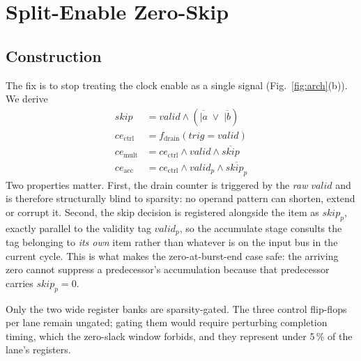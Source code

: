 \documentclass[journal,twocolumn]{IEEEtran}
\begin{document}
\section{Split-Enable Zero-Skip}
\label{sec:fix}

\subsection{Construction}
The fix is to stop treating the clock enable as a single signal
(Fig.~\ref{fig:arch}(b)). We derive
\begin{align}
\mathit{skip} &= \mathit{valid}\wedge\left(\overline{|a}\;\vee\;\overline{|b}\right)\\
\mathit{ce}_{\mathrm{ctrl}} &= f_{\mathrm{drain}}(\mathit{trig}=\mathit{valid})\\
\mathit{ce}_{\mathrm{mult}} &= \mathit{ce}_{\mathrm{ctrl}}\wedge \mathit{valid}\wedge\overline{\mathit{skip}}\\
\mathit{ce}_{\mathrm{acc}}  &= \mathit{ce}_{\mathrm{ctrl}}\wedge \mathit{valid}_{p}\wedge\overline{\mathit{skip}_{p}}
\end{align}
Two properties matter. First, the drain counter is triggered by the
\emph{raw} $\mathit{valid}$ and is therefore structurally blind to sparsity:
no operand pattern can shorten, extend or corrupt it. Second, the skip
decision is registered alongside the item as $\mathit{skip}_p$, exactly
parallel to the validity tag $\mathit{valid}_p$, so the accumulate stage
consults the tag belonging to \emph{its own} item rather than whatever is on
the input bus in the current cycle. This is what makes the zero-at-burst-end
case safe: the arriving zero cannot suppress a predecessor's accumulation
because that predecessor carries $\mathit{skip}_p=0$.

Only the two wide register banks are sparsity-gated. The three control
flip-flops per lane remain ungated; gating them would require perturbing
completion timing, which the zero-slack window forbids, and they represent
under 5\,\% of the lane's registers.
\end{document}
